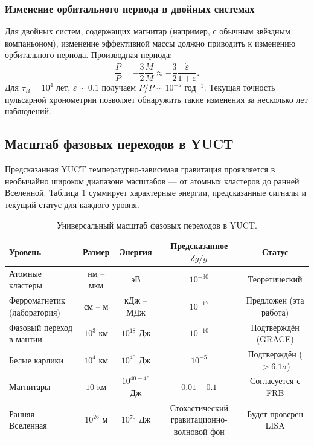 \documentclass[12pt]{article}
\theoremstyle{remark}
\newcommand{\eps}{\varepsilon}
\begin{document}
	\subsubsection{Изменение орбитального периода в двойных системах}
	\label{subsubsec:magnetars-binary}
	
	Для двойных систем, содержащих магнитар (например, с обычным звёздным компаньоном), изменение эффективной массы должно приводить к изменению орбитального периода. Производная периода:
	\begin{equation}
		\frac{\dot{P}}{P} = -\frac{3}{2} \frac{\dot{M}}{M} \approx -\frac{3}{2} \frac{\dot{\eps}}{1+\eps}.
		\label{eq:pdot}
	\end{equation}
	Для $\tau_B = 10^4$ лет, $\eps \sim 0.1$ получаем $\dot{P}/P \sim 10^{-5}$ год$^{-1}$. Текущая точность пульсарной хронометрии позволяет обнаружить такие изменения за несколько лет наблюдений.
	
	\subsection{Масштаб фазовых переходов в YUCT}
	\label{subsec:scale}
	
	Предсказанная YUCT температурно-зависимая гравитация проявляется в необычайно широком диапазоне масштабов — от атомных кластеров до ранней Вселенной. Таблица \ref{tab:scale} суммирует характерные энергии, предсказанные сигналы и текущий статус для каждого уровня.
	
	\begin{table}[htbp]
		\centering
		\caption{Универсальный масштаб фазовых переходов в YUCT.}
		\label{tab:scale}
		\small
		\begin{tabular}{lcccc}
			\toprule
			\textbf{Уровень} & \textbf{Размер} & \textbf{Энергия} & \textbf{Предсказанное } \(\delta g/g\) & \textbf{Статус} \\
			\midrule
			Атомные кластеры & нм – мкм & эВ & $10^{-30}$ & Теоретический \\
			Ферромагнетик (лаборатория) & см – м & кДж – МДж & $10^{-17}$ & Предложен (эта работа) \\
			Фазовый переход в мантии & $10^3$ км & $10^{18}$ Дж & $10^{-10}$ & Подтверждён (GRACE) \\
			Белые карлики & $10^4$ км & $10^{46}$ Дж & $10^{-5}$ & Подтверждён ($>6.1\sigma$) \\
			Магнитары & $10$ км & $10^{40-46}$ Дж & $0.01$ – $0.1$ & Согласуется с FRB \\
			Ранняя Вселенная & $10^{26}$ м & $10^{70}$ Дж & Стохастический гравитационно-волновой фон & Будет проверен LISA \\
			\bottomrule
		\end{tabular}
	\end{table}
	
\end{document}
